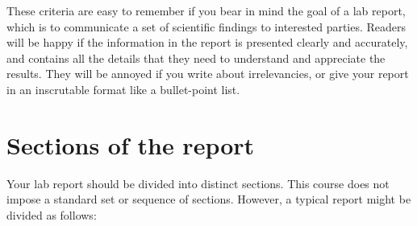 \documentclass[11pt,a4paper]{article}
\begin{document}
\noindent
These criteria are easy to remember if you bear in mind the goal of a
lab report, which is to communicate a set of scientific findings to
interested parties.  Readers will be happy if the information in the
report is presented clearly and accurately, and contains all the
details that they need to understand and appreciate the results.  They
will be annoyed if you write about irrelevancies, or give your report
in an inscrutable format like a bullet-point list.

\section{Sections of the report}

Your lab report should be divided into distinct sections.  This course
does not impose a standard set or sequence of sections.  However, a
typical report might be divided as follows:
\end{document}
